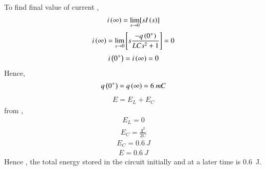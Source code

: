\documentclass[beamer]{IEEEtran}
\theoremstyle{remark}
\begin{document}
To find final value of current ,
\begin{align}
     i\left(\infty\right)=\lim_{s\to0}[sI\left(s\right)]
\end{align}
\begin{align}
   i\left(\infty\right)=\lim_{s\to0}\left[s\frac{-q\left(0^{+}\right)}{LCs^2+1}\right]=0 
\end{align}
\begin{align}
    i\left(0^{+}\right)=i\left(\infty\right)=0
\end{align}
Hence,
\begin{align}
    q\left(0^{+}\right)=q\left(\infty\right)=6\ mC
\end{align}
\begin{align}
    E=E_L+E_C
\end{align}
from ,
\begin{align}
    E_L=0
\end{align}
\begin{align}
    E_C=\frac{q^2}{2C}
\end{align}
\begin{align}
    E_C=0.6\ J
\end{align}
\begin{align}
    E=0.6\ J
\end{align}
Hence , the total energy stored in the circuit initially and at a later time is 0.6\ J.
\end{document}
